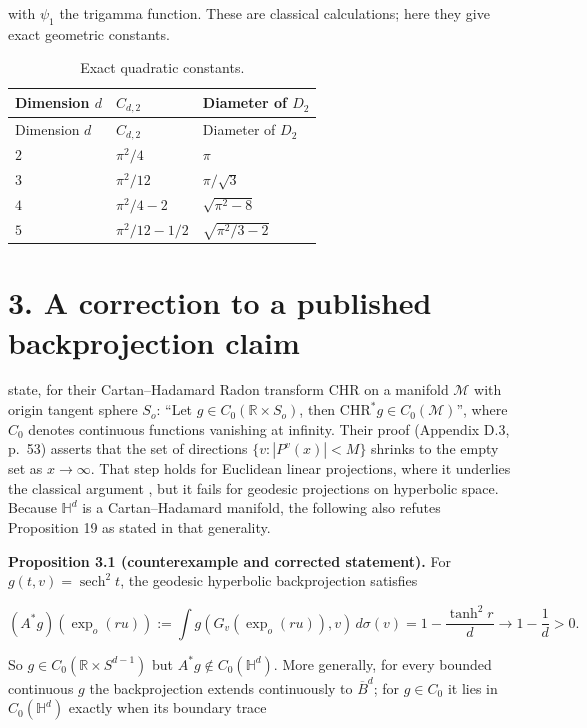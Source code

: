 \documentclass[
  british,
  11pt,
  a4paper,
]{article}
\begin{document}
with \(\psi_1\) the trigamma function. These are classical calculations;
here they give exact geometric constants.

\begin{longtable}[]{@{}lll@{}}
\caption{Exact quadratic constants.}\tabularnewline
\toprule\noalign{}
Dimension \(d\) & \(C_{d,2}\) & Diameter of \(D_2\) \\
\midrule\noalign{}
\endfirsthead
\toprule\noalign{}
Dimension \(d\) & \(C_{d,2}\) & Diameter of \(D_2\) \\
\midrule\noalign{}
\endhead
\bottomrule\noalign{}
\endlastfoot
\(2\) & \(\pi^2/4\) & \(\pi\) \\
\(3\) & \(\pi^2/12\) & \(\pi/\sqrt3\) \\
\(4\) & \(\pi^2/4-2\) & \(\sqrt{\pi^2-8}\) \\
\(5\) & \(\pi^2/12-1/2\) & \(\sqrt{\pi^2/3-2}\) \\
\end{longtable}

\section{3. A correction to a published backprojection
claim}\label{a-correction-to-a-published-backprojection-claim}

\citet[Proposition 19, p.~24]{BDC2025} state, for their Cartan--Hadamard
Radon transform \(\mathrm{CHR}\) on a manifold \(\mathcal M\) with
origin tangent sphere \(S_o\): ``Let \(g\in C_0(\mathbb R\times S_o)\),
then \(\mathrm{CHR}^*g\in C_0(\mathcal M)\)'', where \(C_0\) denotes
continuous functions vanishing at infinity. Their proof (Appendix D.3,
p.~53) asserts that the set of directions \(\{v:|P^v(x)|<M\}\) shrinks
to the empty set as \(x\to\infty\). That step holds for Euclidean linear
projections, where it underlies the classical argument
\citep{BomanLindskog2009}, but it fails for geodesic projections on
hyperbolic space. Because \(\mathbb H^d\) is a Cartan--Hadamard
manifold, the following also refutes Proposition 19 as stated in that
generality.

\textbf{Proposition 3.1 (counterexample and corrected statement).} For
\(g(t,v)=\operatorname{sech}^2t\), the geodesic hyperbolic
backprojection satisfies

\[
(A^*g)(\exp_o(ru))
:=\int g(G_v(\exp_o(ru)),v)\,d\sigma(v)
=1-\frac{\tanh^2r}{d}
\longrightarrow1-\frac1d>0.
\tag{3.1}
\]

So \(g\in C_0(\mathbb R\times S^{d-1})\) but
\(A^*g\notin C_0(\mathbb H^d)\). More generally, for every bounded
continuous \(g\) the backprojection extends continuously to
\(\overline B^d\); for \(g\in C_0\) it lies in \(C_0(\mathbb H^d)\)
exactly when its boundary trace
\end{document}
